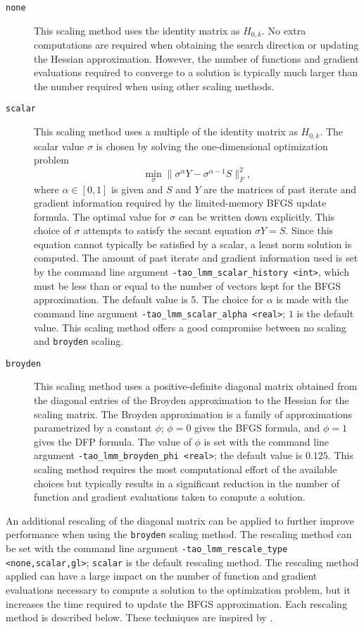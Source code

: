 \begin{description}
\item[{\tt none}]  This scaling method uses the identity matrix as 
$H_{0,k}$.  No extra computations are required when obtaining the 
search direction or updating the Hessian approximation.  However, 
the number of functions and gradient evaluations required to converge
to a solution is typically much larger than the number required when 
using other scaling methods.
\item[{\tt scalar}]  This scaling method uses a multiple of the identity 
matrix as $H_{0,k}$.  The scalar value $\sigma$ is chosen by solving the 
one-dimensional optimization problem
\[
\min_\sigma \|\sigma^\alpha Y - \sigma^{\alpha - 1} S\|_F^2,
\]
where $\alpha \in [0,1]$ is given and $S$ and $Y$ are the matrices of 
past iterate and gradient information required by the limited-memory
BFGS update formula.  The optimal value for $\sigma$ can be written
down explicitly.  This choice of $\sigma$ attempts to satisfy the 
secant equation $\sigma Y = S$.  Since this equation cannot typically
be satisfied by a scalar, a least norm solution is computed.  The amount 
of past iterate and gradient information used is set by the command line 
argument {\tt -tao\_lmm\_scalar\_history <int>}, which must be less than 
or equal to the number of vectors kept for the BFGS approximation.  
The default value is 5.  The choice for $\alpha$ is made with the command 
line argument {\tt -tao\_lmm\_scalar\_alpha <real>}; $1$ is the default
value.  This scaling method offers a good compromise between no scaling 
and {\tt broyden} scaling.
\item[{\tt broyden}] This scaling method uses a positive-definite diagonal 
matrix obtained from the diagonal entries of the Broyden approximation to 
the Hessian for the scaling matrix.  The Broyden approximation is a 
family of approximations parametrized by a constant $\phi$; $\phi = 0$ 
gives the BFGS formula, and $\phi = 1$ gives the DFP formula.  The value 
of $\phi$ is set with the command line argument 
{\tt -tao\_lmm\_broyden\_phi <real>}; the default value is $0.125$.  
This scaling method requires the most computational effort of the
available choices but typically results in a significant reduction 
in the number of function and gradient evaluations taken to compute a 
solution.
\end{description}

An additional rescaling of the diagonal matrix can be applied to further
improve performance when using the {\tt broyden} scaling method.  The
rescaling method can be set with the command line argument 
{\tt -tao\_lmm\_rescale\_type <none,scalar,gl>}; {\tt scalar} is the 
default rescaling method.  The rescaling method applied can have a large 
impact on the number of function and gradient evaluations necessary to 
compute a solution to the optimization problem, but it increases the time
required to update the BFGS approximation.  Each rescaling method is 
described below.  These techniques are inspired by \cite{Gilbert-Lemarechal}.

